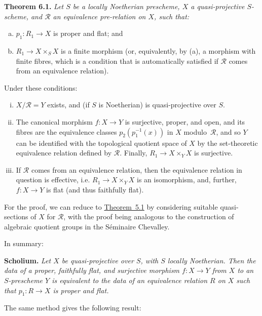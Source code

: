\documentclass{article}
\newenvironment{itenv}[1]
  {\phantomsection\par\medskip\noindent\textbf{#1.}\itshape}
  {\medskip}
\renewcommand{\cal}[1]{{\mathcal{#1}}}
\newcommand{\oldpage}[1]{\marginpar{\footnotesize$\Big\vert$ \textit{p.~#1}}}
\begin{document}
\begin{itenv}{Theorem 6.1}
  Let $S$ be a \emph{locally Noetherian} prescheme, $X$ a \emph{quasi-projective} $S$-scheme, and $\cal{R}$ an equivalence pre-relation on $X$, such that:
\oldpage{212-15}
  \begin{enumerate}[(a)]
    \item $p_1\colon R_1\to X$ is proper and flat; and
    \item $R_1\to X\times_S X$ is a finite morphism (or, equivalently, by (a), a morphism with finite fibres, which is a condition that is automatically satisfied if $\cal{R}$ comes from an equivalence relation).
  \end{enumerate}
  Under these conditions:
  \begin{enumerate}[(i)]
    \item $X/\cal{R}=Y$ exists, and (if $S$ is Noetherian) is quasi-projective over $S$.
    \item The canonical morphism $f\colon X\to Y$ is surjective, proper, and open, and its fibres are the equivalence classes $p_2(p_1^{-1}(x))$ in $X$ modulo~$\cal{R}$, and so $Y$ can be identified with the topological quotient space of $X$ by the set-theoretic equivalence relation defined by $\cal{R}$.
      Finally, $R_1\to X\times_Y X$ is surjective.
    \item If $\cal{R}$ comes from an equivalence relation, then the equivalence relation in question is effective, i.e. $R_1\to X\times_Y X$ is an isomorphism, and, further, $f\colon X\to Y$ is flat (and thus faithfully flat).
  \end{enumerate}
\end{itenv}

For the proof, we can reduce to \hyperref[theorem5.1]{Theorem~5.1} by considering suitable quasi-sections of $X$ for $\cal{R}$, with the proof being analogous to the construction of algebraic quotient groups in the S\'{e}minaire Chevalley.

In summary:

\begin{itenv}{Scholium}
  Let $X$ be quasi-projective over $S$, with $S$ locally Noetherian.
  Then the data of a proper, faithfully flat, and surjective morphism $f\colon X\to Y$ from $X$ to an $S$-prescheme $Y$ is equivalent to the data of an equivalence relation $R$ on $X$ such that $p_1\colon R\to X$ is proper and flat.
\end{itenv}

The same method gives the following result:
\end{document}
